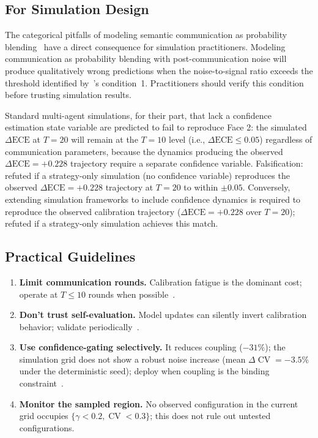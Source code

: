 \documentclass[11pt]{article}
\DeclareMathOperator{\CV}{CV}
\begin{document}
\subsection{For Simulation Design}

The categorical pitfalls of modeling semantic communication as probability blending~\cite{foerster2016learning,kapetanakis2014balanced} have a direct consequence for simulation practitioners. Modeling communication as probability blending with post-communication noise will produce qualitatively wrong predictions when the noise-to-signal ratio exceeds the threshold identified by~\citet{foerster2016learning}'s condition~1. Practitioners should verify this condition before trusting simulation results.

Standard multi-agent simulations, for their part, that lack a confidence estimation state variable are predicted to fail to reproduce Face 2: the simulated $\Delta\text{ECE}$ at $T = 20$ will remain at the $T = 10$ level (i.e., $\Delta\text{ECE} \leq 0.05$) regardless of communication parameters, because the dynamics producing the observed $\Delta\text{ECE} = +0.228$ trajectory require a separate confidence variable. Falsification: refuted if a strategy-only simulation (no confidence variable) reproduces the observed $\Delta\text{ECE} = +0.228$ trajectory at $T = 20$ to within $\pm 0.05$. Conversely, extending simulation frameworks to include confidence dynamics is required to reproduce the observed calibration trajectory ($\Delta\text{ECE} = +0.228$ over $T = 20$); refuted if a strategy-only simulation achieves this match.

\subsection{Practical Guidelines}

\begin{enumerate}[leftmargin=*,nosep]
    \item \textbf{Limit communication rounds.} Calibration fatigue is the dominant cost; operate at $T \leq 10$ rounds when possible~\citep{li2025sacd}.
    \item \textbf{Don't trust self-evaluation.} Model updates can silently invert calibration behavior; validate periodically~\citep{zhou2024incontext}.
    \item \textbf{Use confidence-gating selectively.} It reduces coupling ($-31\%$); the simulation grid does not show a robust noise increase (mean $\Delta\CV = -3.5\%$ under the deterministic seed); deploy when coupling is the binding constraint~\citep{chen2025unicr}.
    \item \textbf{Monitor the sampled region.} No observed configuration in the current grid occupies $\{\gamma < 0.2, \CV < 0.3\}$; this does not rule out untested configurations.
\end{enumerate}
\end{document}
